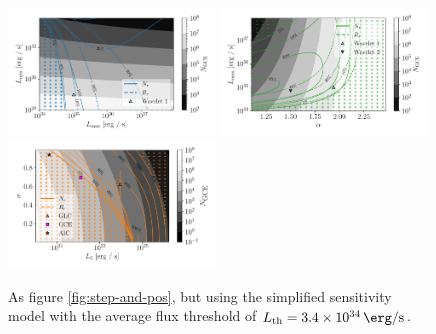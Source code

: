 \documentclass[letter,11pt]{article}
\begin{document}
\begin{figure}
    \centering
    \includegraphics[width=0.49\textwidth]{figs/power-law-step-new.pdf}
    \includegraphics[width=0.49\textwidth]{figs/power-law-alpha-step-new.pdf}
    \includegraphics[width=0.49\textwidth]{figs/log-normal-step-new.pdf}
    \caption{As figure \ref{fig:step-and-pos}, but using the simplified sensitivity model with the average flux threshold of $L_\text{th} = \SI{3.4e34}{\erg\per\second}$.}
    \label{fig:step-function-new}
\end{figure}
\end{document}
